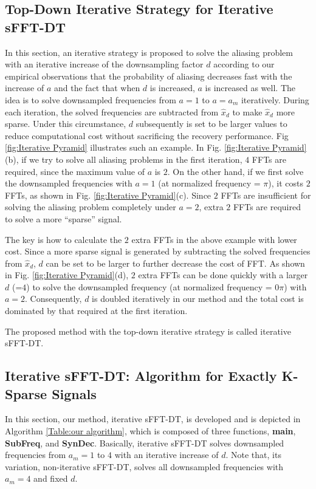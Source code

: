 \documentclass[journal,onecolumn,11pt]{IEEEtran}
\begin{document}
\subsection{Top-Down Iterative Strategy for Iterative sFFT-DT}\label{ssec:ItMethod}
In this section, an iterative strategy is proposed to solve the aliasing problem with an iterative increase of the downsampling factor $d$ according to our empirical observations that the probability of aliasing decreases
fast with the increase of $a$ and the fact that when $d$ is increased, $a$ is increased as well.
The idea is to solve downsampled frequencies from $a=1$ to $a=a_{m}$ iteratively.
During each iteration, the solved frequencies are subtracted from $\hat{x}_{d}$ to make $\hat{x}_{d}$ more sparse.
Under this circumstance, $d$ subsequently is set to be larger values to reduce computational cost without sacrificing the recovery performance.
Fig \ref{fig:Iterative Pyramid} illustrates such an example.
In Fig. \ref{fig:Iterative Pyramid}(b), if we try to solve all aliasing problems in the first iteration, $4$ FFTs are required, since the maximum value of $a$ is $2$.
On the other hand, if we first solve the downsampled frequencies with $a=1$ (at normalized frequency = $\pi$), it costs $2$ FFTs, as shown in Fig. \ref{fig:Iterative Pyramid}(c).
Since $2$ FFTs are insufficient for solving the aliasing problem completely under $a=2$, extra $2$ FFTs are required to solve a more ``sparse'' signal.

The key is how to calculate the $2$ extra FFTs in the above example with lower cost.
Since a more sparse signal is generated by subtracting the solved frequencies from $\hat{x}_{d}$, $d$ can be set to be larger to further decrease the cost of FFT.
As shown in Fig. \ref{fig:Iterative Pyramid}(d), $2$ extra FFTs can be done quickly with a larger $d$ (=$4$) to solve the downsampled frequency (at normalized frequency = $0\pi$) with $a=2$.
Consequently, $d$ is doubled iteratively in our method and the total cost is dominated by that required at the first iteration.

The proposed method with the top-down iterative strategy is called iterative sFFT-DT.

\subsection{Iterative sFFT-DT: Algorithm for Exactly K-Sparse Signals}\label{ssec:exact_algorithm}

In this section, our method, iterative sFFT-DT, is developed and is depicted in Algorithm \ref{Table:our algorithm}, which is composed of three functions, \textbf{main}, \textbf{SubFreq}, and \textbf{SynDec}.
Basically, iterative sFFT-DT solves downsampled frequencies from $a_{m}=1$ to $4$ with an iterative increase of $d$.
Note that, its variation, non-iterative sFFT-DT, solves all downsampled frequencies with $a_{m} = 4$ and fixed $d$.
\end{document}
